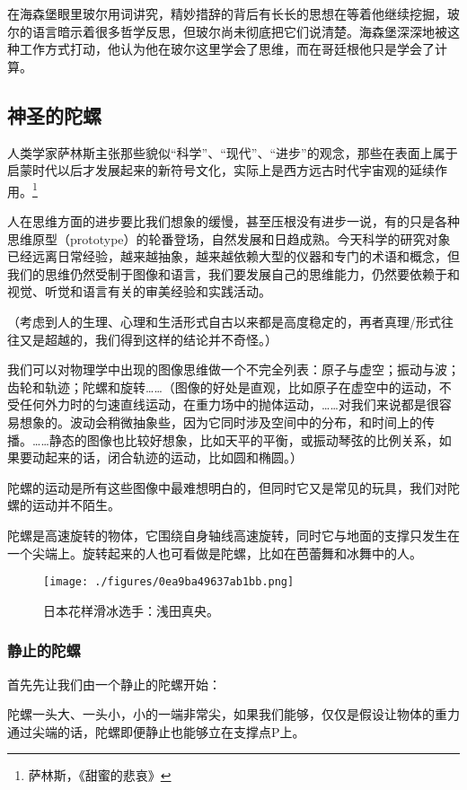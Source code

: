 在海森堡眼里玻尔用词讲究，精妙措辞的背后有长长的思想在等着他继续挖掘，玻尔的语言暗示着很多哲学反思，但玻尔尚未彻底把它们说清楚。海森堡深深地被这种工作方式打动，他认为他在玻尔这里学会了思维，而在哥廷根他只是学会了计算。

\subsection{神圣的陀螺}

人类学家萨林斯主张那些貌似“科学”、“现代”、“进步”的观念，那些在表面上属于启蒙时代以后才发展起来的新符号文化，实际上是西方远古时代宇宙观的延续作用。\footnote{萨林斯，《甜蜜的悲哀》} 

人在思维方面的进步要比我们想象的缓慢，甚至压根没有进步一说，有的只是各种思维原型（prototype）的轮番登场，自然发展和日趋成熟。今天科学的研究对象已经远离日常经验，越来越抽象，越来越依赖大型的仪器和专门的术语和概念，但我们的思维仍然受制于图像和语言，我们要发展自己的思维能力，仍然要依赖于和视觉、听觉和语言有关的审美经验和实践活动。

（考虑到人的生理、心理和生活形式自古以来都是高度稳定的，再者真理/形式往往又是超越的，我们得到这样的结论并不奇怪。）

我们可以对物理学中出现的图像思维做一个不完全列表：原子与虚空；振动与波；齿轮和轨迹；陀螺和旋转……（图像的好处是直观，比如原子在虚空中的运动，不受任何外力时的匀速直线运动，在重力场中的抛体运动，……对我们来说都是很容易想象的。波动会稍微抽象些，因为它同时涉及空间中的分布，和时间上的传播。……静态的图像也比较好想象，比如天平的平衡，或振动琴弦的比例关系，如果要动起来的话，闭合轨迹的运动，比如圆和椭圆。）

陀螺的运动是所有这些图像中最难想明白的，但同时它又是常见的玩具，我们对陀螺的运动并不陌生。

陀螺是高速旋转的物体，它围绕自身轴线高速旋转，同时它与地面的支撑只发生在一个尖端上。旋转起来的人也可看做是陀螺，比如在芭蕾舞和冰舞中的人。

\begin{figure}[ht]
\centering
\texttt{[image: ./figures/0ea9ba49637ab1bb.png]}
\caption{日本花样滑冰选⼿：浅田真央。} \label{fig_QMPre2_2}
\end{figure}

\subsubsection{静止的陀螺}

首先先让我们由一个静止的陀螺开始：

陀螺一头大、一头小，小的一端非常尖，如果我们能够，仅仅是假设让物体的重力通过尖端的话，陀螺即便静止也能够立在支撑点P上。

